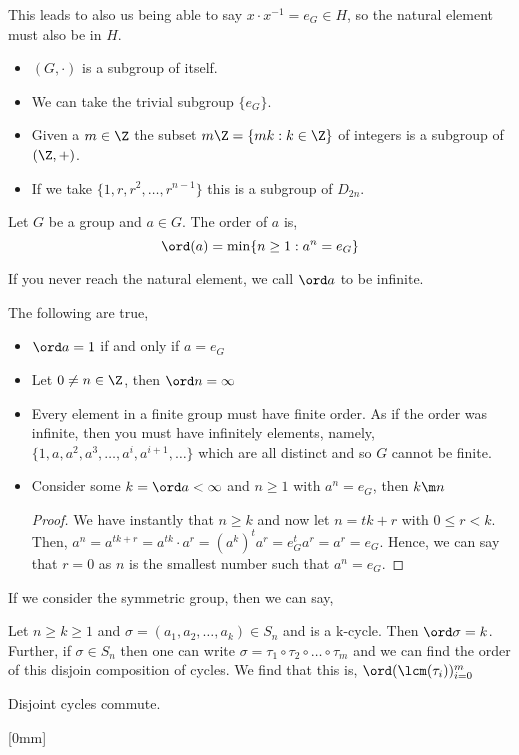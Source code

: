 This leads to also us being able to say $x \cdot x ^{-1} = e_G \in H$, so the natural element must also be in $H$.

\begin{eg}
  \begin{itemize}
    \item $(G, \cdot)$ is a subgroup of itself.
    \item We can take the trivial subgroup $\{e_G\}$.
    \item Given a $m \in \Z$ the subset $m\Z = \{mk : k \in \Z\}$ of integers is a subgroup of $(\Z, +)$.
    \item If we take $\{1, r, r^2, \dots, r^{n-1}\}$ this is a subgroup of $D_{2n}$.
  \end{itemize}
\end{eg}

\begin{ndefi}
  Let $G$ be a group and $a \in G$. The order of $a$ is,
  $$ \ord (a) = \min \{n \ge 1 : a^n = e_G\} $$
\end{ndefi}
If you never reach the natural element, we call $\ord a$ to be infinite.

\begin{nlemma}
  The following are true,
  \begin{itemize}
    \item $\ord a = 1$ if and only if $a = e_G$
    \item Let $0 \ne n \in \Z$, then $\ord n = \infty$
    \item Every element in a finite group must have finite order. As if the order was infinite, then you must have infinitely elements, namely, $\{1, a, a^2, a^3, \dots, a^i, a^{i+1}, \dots\}$ which are all distinct and so $G$ cannot be finite.
    \item Consider some $k = \ord a < \infty$ and $n \ge 1$ with $a^n = e_G$, then $k \m n$
    \begin{proof}
      We have instantly that $n \ge k$ and now let $n = tk + r$ with $0 \le r < k$. Then, $a^n = a^{tk+r} = a^{tk} \cdot a^r = (a^k)^ta^r = e_G^ta^r = a^r = e_G$. Hence, we can say that $r = 0$ as $n$ is the smallest number such that $a^n = e_G$.
    \end{proof}
  \end{itemize}
\end{nlemma}

If we consider the symmetric group, then we can say,
\begin{nlemma}
  Let $n \ge k \ge 1$ and $\sigma = (a_1, a_2, \dots, a_k) \in S_n$ and is a k-cycle. Then $\ord \sigma = k$. Further, if $\sigma \in S_n$ then one can write $\sigma = \tau_1 \circ \tau_2 \circ \dots \circ \tau_m$ and we can find the order of this disjoin composition of cycles. We find that this is, $\ord (\lcm(\tau_i))_{i=0}^m$
\end{nlemma}

\begin{remark}
   Disjoint cycles commute.
\end{remark}[0mm]

